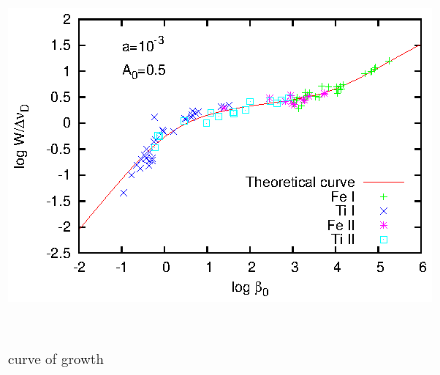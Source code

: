 \documentclass[12pt,a4paper,titlepage]{jarticle}
\begin{document}
\title{}
\author{A4SB2121}
\date{}

\begin{figure}[h]
\begin{center}
\includegraphics[width=130mm,height=100mm]{curve_of_growth_with_data.eps}
\caption{curve of growth}
\end{center}
\end{figure}
\end{document}

